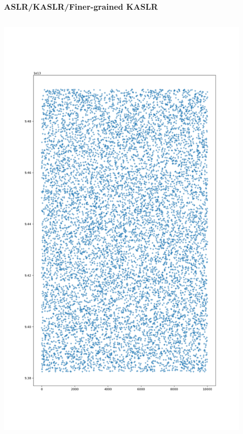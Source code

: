 \documentclass{beamer}
\begin{document}
\begin{CJK*}{UTF8}{bsmi}
    \begin{frame}
        \frametitle{ASLR/KASLR/Finer-grained KASLR}
        \begin{columns}
            \begin{column}{0.5\textwidth}
                \includegraphics[height=.9\textheight]{Figure_1.png}
            \end{column}
            \begin{column}{.5\textwidth}

\end{column}
\end{columns}
\end{frame}
\end{CJK*}
\end{document}

